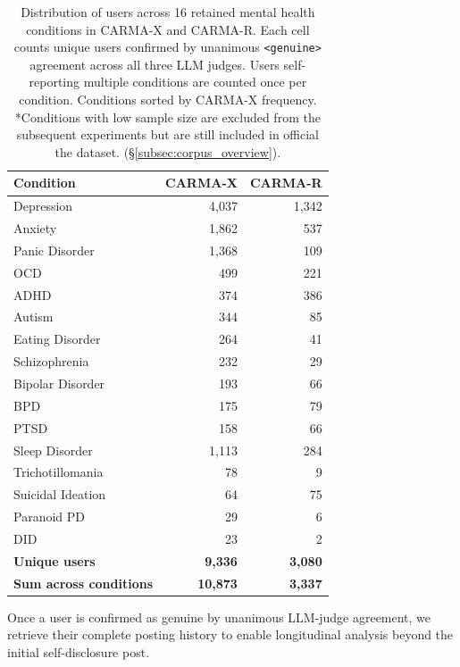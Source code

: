 \documentclass[11pt]{article}
\begin{document}
\begin{table}[h]
\centering
\small
\begin{tabular}{lrr}
\toprule
\textbf{Condition} & \textbf{CARMA-X} & \textbf{CARMA-R} \\
\midrule
Depression          & 4,037 & 1,342 \\
Anxiety             & 1,862 &   537 \\
Panic Disorder      & 1,368 &   109 \\
OCD                 &   499 &   221 \\
ADHD                &   374 &   386 \\
Autism              &    344 &    85 \\
Eating Disorder     &   264 &    41 \\
Schizophrenia       &   232 &    29 \\
Bipolar Disorder    &   193 &    66 \\
BPD                 &   175 &    79 \\
PTSD                &   158 &    66 \\
Sleep Disorder      & 1,113 &   284 \\
Trichotillomania    &    78 &     9 \\
Suicidal Ideation   &    64 &    75 \\
Paranoid PD         &    29 &     6 \\
DID                 &    23 &     2 \\
\midrule
\textbf{Unique users}          & \textbf{9,336} & \textbf{3,080} \\
\textbf{Sum across conditions} & \textbf{10,873}   & \textbf{3,337} \\
\bottomrule
\end{tabular}
\caption{Distribution of users across 16 retained mental health
conditions in CARMA-X and CARMA-R. Each cell counts unique users
confirmed by unanimous \texttt{<genuine>} agreement across all three
LLM judges. Users self-reporting multiple conditions are counted once
per condition. Conditions sorted by CARMA-X frequency. *Conditions with low sample size are excluded from the subsequent experiments but are still included in official the dataset.
(§\ref{subsec:corpus_overview}).}
\label{tab:corpus_summary}
\end{table}


Once a user is confirmed as genuine by unanimous LLM-judge agreement, we retrieve their complete posting history to enable longitudinal analysis beyond the initial self-disclosure post.
\end{document}
